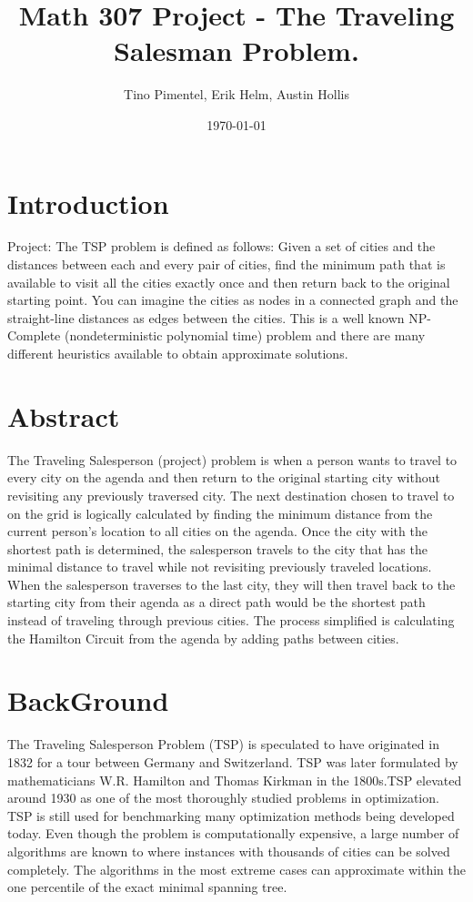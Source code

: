 \documentclass[a4paper,11pt]{scrartcl}
\title{Math 307 Project - The Traveling Salesman Problem.}
\author{Tino Pimentel, Erik Helm, Austin Hollis}
\date{\today}
\begin{document}
\maketitle

%

\section{Introduction}

Project:  The TSP problem is defined as follows: Given a set of cities and the distances between each and every pair of cities, find the minimum path that is available to visit all the cities exactly once and then return back to the original starting point. You can imagine the cities as nodes in a connected graph and the straight-line distances as edges between the cities. This is a well known NP-Complete (nondeterministic polynomial time) problem and there are many different heuristics available to obtain approximate solutions.

\section{Abstract}

The Traveling Salesperson (project) problem is when a person wants to travel to every city on the agenda and then return to the original starting city without revisiting any previously traversed city. The next destination chosen to travel to on the grid is logically calculated by finding the minimum distance from the current person’s location to all cities on the agenda. Once the city with the shortest path is determined, the salesperson travels to the city that has the minimal distance to travel while not revisiting previously traveled locations. When the salesperson traverses to the last city, they will then travel back to the starting city from their agenda as a direct path would be the shortest path instead of traveling through previous cities. The process simplified is calculating the Hamilton Circuit from the agenda by adding paths between cities. 
 
\section{BackGround}

The Traveling Salesperson Problem (TSP) is speculated to have originated in 1832 for a tour between Germany and Switzerland. TSP was later formulated by mathematicians W.R. Hamilton and Thomas Kirkman in the 1800s.TSP elevated around 1930 as one of the most thoroughly studied problems in optimization. TSP is still used for benchmarking many optimization methods being developed today. Even though the problem is computationally expensive, a large number of algorithms are known to where  instances with thousands of cities can be solved completely. The algorithms in the most extreme cases can approximate within the one percentile of the exact minimal spanning tree.  
\end{document}

